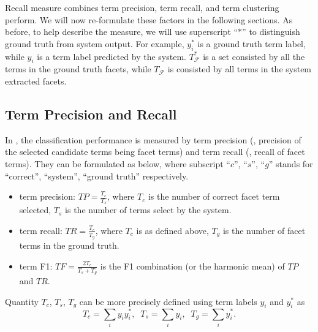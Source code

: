 Recall \PRF measure combines term precision, term recall, and term clustering perform. We will now re-formulate these factors in the following sections. As before, to help describe the measure, we will use superscript ``$*$'' to distinguish ground truth from system output. For example, $y_i^*$ is a ground truth term label, while $y_i$ is a term label predicted by the system. $T_\mathcal{F}^*$ is a set consisted by all the terms in the ground truth facets, while $T_\mathcal{F}$ is consisted by all terms in the system extracted facets.

\subsection{Term Precision and Recall}
In \PRF, the classification performance is measured by term precision (\ie, precision of the selected candidate terms being facet terms) and term recall (\ie, recall of facet terms).  They can be formulated as below, where subscript ``$c$'', ``$s$'', ``$g$'' stands for ``correct'', ``system'', ``ground truth'' respectively.
\begin{itemize}
 \item term precision: $T\!P = \frac{T_c}{T_s}$, where $T_c$ is the number of correct facet term selected, $T_s$ is the number of terms select by the system. 
 \item term recall: $T\!R = \frac{T_c}{T_g}$, where $T_c$ is as defined above, $T_g$ is the number of facet terms in the ground truth.
 \item term F1: $T\!F=\frac{2T_c}{T_s+T_g}$ is the F1 combination (or the harmonic mean) of $T\!P$ and $T\!R$.
\end{itemize}

Quantity $T_c$, $T_s$, $T_g$ can be more precisely defined using term labels $y_i$ and $y_i^{*}$ as
\begin{equation}
\label{eq:qterm}
 T_c=\sum_i{y_iy_i^{*}}, \;\; T_s=\sum_i{y_i}, \;\; T_g=\sum_i{y_i^{*}}.
\end{equation}

